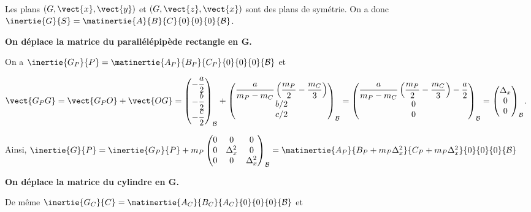 \ifprof ~\\

Les plans $(G,\vect{x},\vect{y})$ et $(G,\vect{z},\vect{x})$ sont des plans de symétrie. 
On a donc $\inertie{G}{S}=\matinertie{A}{B}{C}{0}{0}{0}{\mathcal{B}}$.

\textbf{On déplace la matrice du parallélépipède rectangle en G.}

On a $\inertie{G_P}{P}=\matinertie{A_P}{B_P}{C_P}{0}{0}{0}{\mathcal{B}}$ et


$\vect{G_P G} = \vect{G_P O} + \vect{O G} = 
\begin{pmatrix}
-\dfrac{a}{2} \\
-\dfrac{b}{2} \\
-\dfrac{c}{2}
\end{pmatrix}_{\mathcal{B}} 
+
\begin{pmatrix}
\dfrac{a}{m_P-m_C} \left( \dfrac{m_P}{2} -  \dfrac{m_C}{3}\right) \\
b/2 \\
c/2
\end{pmatrix}_{\mathcal{B}}=
\begin{pmatrix}
\dfrac{a}{m_P-m_C} \left( \dfrac{m_P}{2} -  \dfrac{m_C}{3}\right) -\dfrac{a}{2}\\
0 \\
0
\end{pmatrix}_{\mathcal{B}}=
\begin{pmatrix}
\Delta_x\\
0 \\
0
\end{pmatrix}_{\mathcal{B}}$.

Ainsi, 
$\inertie{G}{P} = \inertie{G_P}{P} + m_P\begin{pmatrix}
0 & 0 & 0\\
0 & \Delta_x^2 & 0 \\
0 & 0 & \Delta_x^2
\end{pmatrix}_{\mathcal{B}}
= \matinertie{A_P}{B_P+m_P\Delta_x^2}{C_P+m_P\Delta_x^2}{0}{0}{0}{\mathcal{B}}
$

\textbf{On déplace la matrice du cylindre en G.}

De même $\inertie{G_C}{C}=\matinertie{A_C}{B_C}{A_C}{0}{0}{0}{\mathcal{B}}$ et

